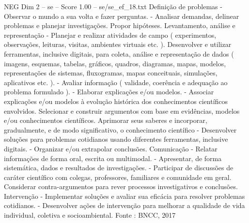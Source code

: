 \begin{textsample}{NEG Dim 2 – se – Score 1.00 – se/se\_ef\_18.txt}  \label{ex:f2_neg_264}
Definição de problemas - Observar o mundo a sua volta e fazer perguntas. - Analisar demandas, delinear problemas e planejar investigações.
Propor hipóteses.
Levantamento, análise e representação - Planejar e realizar atividades de campo ( experimentos, observações, leituras, visitas, ambientes virtuais etc. ).
Desenvolver e utilizar ferramentas, inclusive digitais, para coleta, análise e representação de dados ( imagens, esquemas, tabelas, gráficos, quadros, diagramas, mapas, modelos, representações de sistemas, fluxogramas, mapas conceituais, simulações, aplicativos etc. ). - Avaliar informação ( validade, coerência e adequação ao problema formulado ). - Elaborar explicações e/ou modelos. - Associar explicações e/ou modelos à evolução histórica dos conhecimentos científicos envolvidos.
Selecionar e construir argumentos com base em evidências, modelos e/ou conhecimentos científicos.
Aprimorar seus saberes e incorporar, gradualmente, e de modo significativo, o conhecimento científico - Desenvolver soluções para problemas cotidianos usando diferentes ferramentas, inclusive digitais. - Organizar e/ou extrapolar conclusões.
Comunicação - Relatar informações de forma oral, escrita ou multimodal. - Apresentar, de forma sistemática, dados e resultados de investigações. - Participar de discussões de caráter científico com colegas, professores, familiares e comunidade em geral.
Considerar contra-argumentos para rever processos investigativos e conclusões.
Intervenção - Implementar soluções e avaliar sua eficácia para resolver problemas cotidianos. - Desenvolver ações de intervenção para melhorar a qualidade de vida individual, coletiva e socioambiental.
Fonte : BNCC, 2017

\end{textsample}
